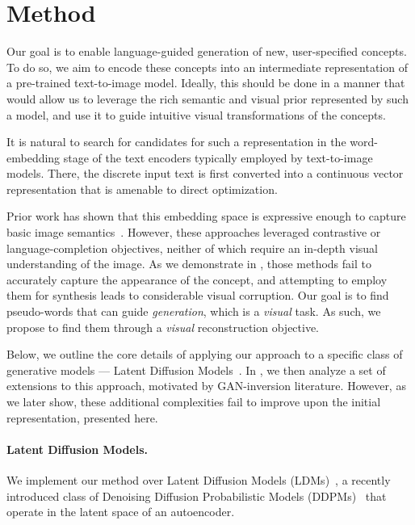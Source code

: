 \section{Method}
\label{sec:method}




Our goal is to enable language-guided generation of new, user-specified concepts. To do so, we aim to encode these concepts into an intermediate representation of a pre-trained text-to-image model. 
Ideally, this should be done in a manner that would allow us to leverage the rich semantic and visual prior represented by such a model, and use it to guide intuitive visual transformations of the concepts.

It is natural to search for candidates for such a representation in the word-embedding stage of the text encoders typically employed by text-to-image models. There, the discrete input text is first converted into a continuous vector representation that is amenable to direct optimization.

Prior work has shown that this embedding space is expressive enough to capture basic image semantics~\citep{cohen2022my,tsimpoukelli2021multimodal}. However, these approaches leveraged contrastive or language-completion objectives, neither of which require an in-depth visual understanding of the image. As we demonstrate in , those methods fail to accurately capture the appearance of the concept, and attempting to employ them for synthesis leads to considerable visual corruption. Our goal is to find pseudo-words that can guide \textit{generation}, which is a \textit{visual} task. As such, we propose to find them through a \textit{visual} reconstruction objective. 


Below, we outline the core details of applying our approach to a specific class of generative models --- Latent Diffusion Models~\citep{rombach2021highresolution}. In , we then analyze a set of extensions to this approach, motivated by GAN-inversion literature. However, as we later show, these additional complexities fail to improve upon the initial representation, presented here. 












\paragraph{Latent Diffusion Models.}
We implement our method over Latent Diffusion Models (LDMs)~\citep{rombach2021highresolution}, a recently introduced class of Denoising Diffusion Probabilistic Models (DDPMs)~\citep{ho2020denoising} that operate in the latent space of an autoencoder. 

